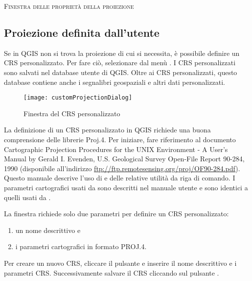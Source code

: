 \begin{Tip}
 \caption{\textsc{Finestra delle proprietà della proiezione}}
\end{Tip}

\subsection{Proiezione definita dall'utente}\label{sec:customprojections}

Se in QGIS non si trova la proiezione di cui si necessita, è possibile
definire un CRS personalizzato. Per fare ciò, selezionare
 dal menù
. I CRS personalizzati sono salvati nel database
utente di QGIS. Oltre ai CRS personalizzati, questo database contiene anche i
segnalibri geospaziali e altri dati personalizzati. 

\begin{figure}[ht]
   \begin{center}
   \caption{Finestra del CRS personalizzato \nixcaption}\label{fig:customprojections}\smallskip
   \texttt{[image: customProjectionDialog]}
\end{center}  
\end{figure}

La definizione di un CRS personalizzato in QGIS richiede una buona
comprensione delle librerie Proj.4. Per iniziare, fare riferimento al
documento Cartographic Projection Procedures for the UNIX Environment - A User's Manual
by Gerald I. Evenden, U.S. Geological Survey Open-File Report 90-284, 1990
(disponibile all'indirizzo \url{ftp://ftp.remotesensing.org/proj/OF90-284.pdf}).
Questo manuale descrive l'uso di  e delle relative utilità da
riga di comando. I parametri cartografici usati da  sono
descritti nel manuale utente e sono identici a quelli usati da . 

La finestra 
richiede solo due parametri per definire un CRS personalizzato: 
\begin{enumerate}
\item un nome descrittivo e
\item i parametri cartografici in formato PROJ.4.
\end{enumerate}
Per creare un nuovo CRS, cliccare il pulsante  e
inserire il nome descrittivo e i parametri CRS. Successivamente salvare il CRS
cliccando sul pulsante .

